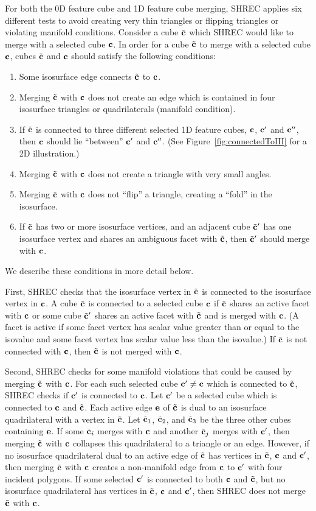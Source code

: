 For both the 0D feature cube and 1D feature cube merging,
SHREC applies six different tests to avoid creating very thin triangles
or flipping triangles or violating manifold conditions.
Consider a cube ${\tilde{\mathbf{c}}}$ which SHREC would like to merge 
with a selected cube $\mathbf{c}$.
In order for a cube ${\tilde{\mathbf{c}}}$ to merge with a selected cube $\mathbf{c}$,
cubes ${\tilde{\mathbf{c}}}$ and $\mathbf{c}$ should satisfy the following conditions:
\begin{enumerate}
\item Some isosurface edge connects ${\tilde{\mathbf{c}}}$ to $\mathbf{c}$.
\item Merging ${\tilde{\mathbf{c}}}$ with $\mathbf{c}$ does not create an edge 
which is contained in four isosurface triangles or quadrilaterals
(manifold condition).
\item If ${\tilde{\mathbf{c}}}$ is connected to three different selected 1D feature cubes,
$\mathbf{c}$, $\mathbf{c}'$ and $\mathbf{c}''$,
then $\mathbf{c}$ should lie ``between'' $\mathbf{c}'$ and $\mathbf{c}''$.
(See Figure~\ref{fig:connectedToIII} for a 2D illustration.)
\item Merging ${\tilde{\mathbf{c}}}$ with $\mathbf{c}$ does not create a triangle
with very small angles.
\item Merging ${\tilde{\mathbf{c}}}$ with $\mathbf{c}$ does not ``flip'' a triangle,
creating a ``fold'' in the isosurface.
\item If ${\tilde{\mathbf{c}}}$ has two or more isosurface vertices,
and an adjacent cube ${\tilde{\mathbf{c}}}'$ has one isosurface vertex
and shares an ambiguous facet with ${\tilde{\mathbf{c}}}$,
then ${\tilde{\mathbf{c}}}'$ should merge with $\mathbf{c}$.
\end{enumerate}
We describe these conditions in more detail below.

First, SHREC checks that the isosurface vertex in ${\tilde{\mathbf{c}}}$
is connected to the isosurface vertex in $\mathbf{c}$.
A cube ${\tilde{\mathbf{c}}}$ is connected to a selected cube $\mathbf{c}$
if ${\tilde{\mathbf{c}}}$ shares an active facet with $\mathbf{c}$
or some cube ${\tilde{\mathbf{c}}}'$ shares an active facet with ${\tilde{\mathbf{c}}}$ and
is merged with $\mathbf{c}$.
(A facet is active if some facet vertex has scalar value greater than
or equal to the isovalue and some facet vertex has scalar value less
than the isovalue.)
If ${\tilde{\mathbf{c}}}$ is not connected with $\mathbf{c}$, then ${\tilde{\mathbf{c}}}$ is not merged with $\mathbf{c}$.

Second, SHREC checks for some manifold violations that
could be caused by merging ${\tilde{\mathbf{c}}}$ with $\mathbf{c}$.
For each such selected cube $\mathbf{c}' \neq \mathbf{c}$ which is connected to ${\tilde{\mathbf{c}}}$,
SHREC checks if $\mathbf{c}'$ is connected to $\mathbf{c}$.
Let $\mathbf{c}'$ be a selected cube which is connected to $\mathbf{c}$ and ${\tilde{\mathbf{c}}}$.
Each active edge $\mathbf{e}$ of ${\tilde{\mathbf{c}}}$ is dual to an isosurface quadrilateral
with a vertex in ${\tilde{\mathbf{c}}}$.
Let ${\tilde{\mathbf{c}}}_1$, ${\tilde{\mathbf{c}}}_2$, and ${\tilde{\mathbf{c}}}_3$ be the three other cubes containing $\mathbf{e}$.
If some ${\tilde{\mathbf{c}}}_i$ merges with $\mathbf{c}$ and another ${\tilde{\mathbf{c}}}_j$ merges with $\mathbf{c}'$,
then merging ${\tilde{\mathbf{c}}}$ with $\mathbf{c}$ collapses this quadrilateral to a triangle
or an edge.
However, if no isosurface quadrilateral dual to an active edge of ${\tilde{\mathbf{c}}}$
has vertices in ${\tilde{\mathbf{c}}}$, $\mathbf{c}$ and $\mathbf{c}'$,
then merging ${\tilde{\mathbf{c}}}$ with $\mathbf{c}$ creates a non-manifold edge 
from $\mathbf{c}$ to $\mathbf{c}'$ with four incident polygons.
If some selected $\mathbf{c}'$ is connected to both $\mathbf{c}$ and ${\tilde{\mathbf{c}}}$,
but no isosurface quadrilateral has vertices in ${\tilde{\mathbf{c}}}$, $\mathbf{c}$ and $\mathbf{c}'$,
then SHREC does not merge ${\tilde{\mathbf{c}}}$ with $\mathbf{c}$.

